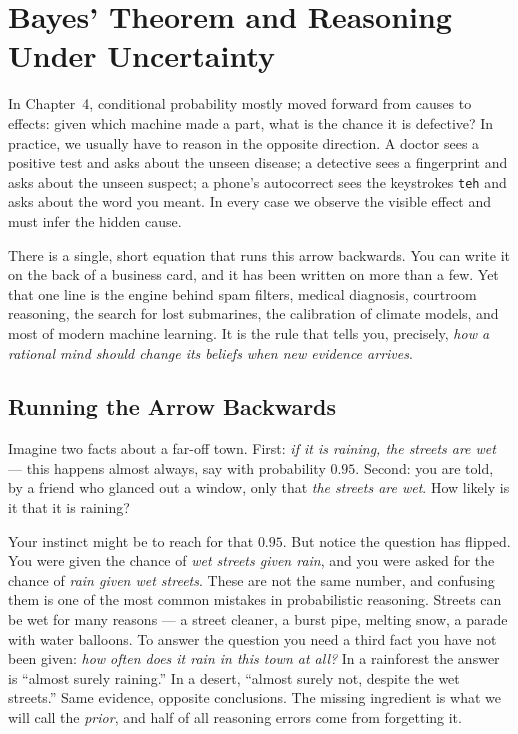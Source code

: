 \chapter{Bayes' Theorem and Reasoning Under Uncertainty}

In Chapter~4, conditional probability mostly moved forward from causes to
effects: given which machine made a part, what is the chance it is defective? In
practice, we usually have to reason in the opposite direction. A doctor sees a
positive test and asks about the unseen disease; a detective sees a fingerprint
and asks about the unseen suspect; a phone's autocorrect sees the keystrokes
\texttt{teh} and asks about the word you meant. In every case we observe the
visible effect and must infer the hidden cause.

There is a single, short equation that runs this arrow backwards. You can write
it on the back of a business card, and it has been written on more than a few.
Yet that one line is the engine behind spam filters, medical diagnosis,
courtroom reasoning, the search for lost submarines, the calibration of climate
models, and most of modern machine learning. It is the rule that tells you,
precisely, \emph{how a rational mind should change its beliefs when new
evidence arrives}.

\chapterline

\section{Running the Arrow Backwards}
\label{ch05:backwards}

\begin{intuitionbox}
Imagine two facts about a far-off town. First: \emph{if it is raining, the streets are
wet} --- this happens almost always, say with probability $0.95$. Second: you are told,
by a friend who glanced out a window, only that \emph{the streets are wet}. How likely
is it that it is raining?

Your instinct might be to reach for that $0.95$. But notice the question has flipped.
You were given the chance of \emph{wet streets given rain}, and you were asked for the
chance of \emph{rain given wet streets}. These are not the same number, and confusing
them is one of the most common mistakes in probabilistic reasoning. Streets can be wet for many reasons
--- a street cleaner, a burst pipe, melting snow, a parade with water balloons. To
answer the question you need a third fact you have not been given: \emph{how
often does it rain in this town at all?} In a rainforest the answer is ``almost surely
raining.'' In a desert, ``almost surely not, despite the wet streets.'' Same evidence,
opposite conclusions. The missing ingredient is what we will call the \emph{prior}, and
half of all reasoning errors come from forgetting it.
\end{intuitionbox}

